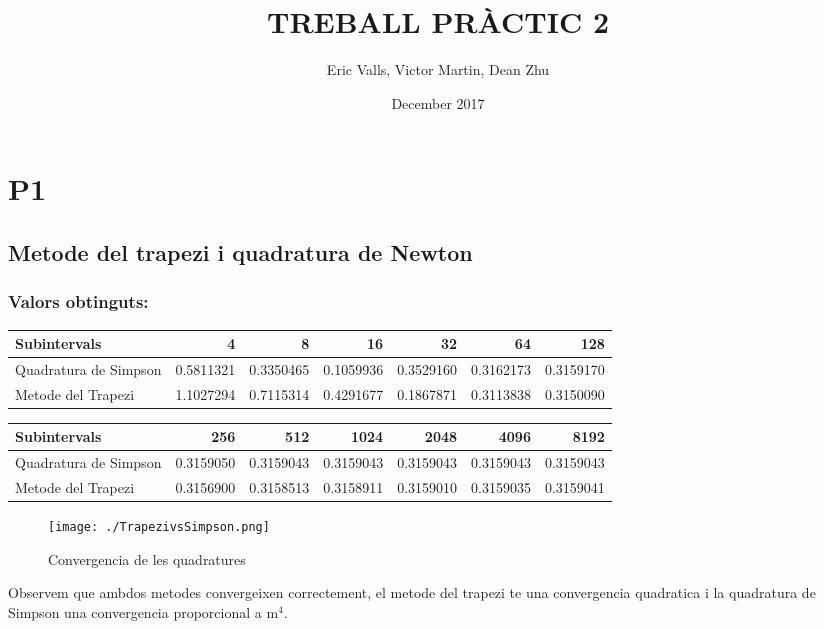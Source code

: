 \documentclass{article}
\title{TREBALL PRÀCTIC 2}
\author{Eric Valls, Victor Martin, Dean Zhu}
\date{December 2017}
\begin{document}
\maketitle
\section{P1}
\label{sec:orgc9ba521}
\subsection{Metode del trapezi i quadratura de Newton}
\label{sec:org8b1c0b6}
\subsubsection{Valors obtinguts:}
\label{sec:org29610ac}
\begin{center}
\begin{tabular}{lrrrrrr}
Subintervals & 4 & 8 & 16 & 32 & 64 & 128\\
\hline
Quadratura de Simpson & 0.5811321 & 0.3350465 & 0.1059936 & 0.3529160 & 0.3162173 & 0.3159170\\
Metode del Trapezi & 1.1027294 & 0.7115314 & 0.4291677 & 0.1867871 & 0.3113838 & 0.3150090\\
\end{tabular}
\end{center}

\begin{center}
\begin{tabular}{lrrrrrr}
Subintervals & 256 & 512 & 1024 & 2048 & 4096 & 8192\\
\hline
Quadratura de Simpson & 0.3159050 & 0.3159043 & 0.3159043 & 0.3159043 & 0.3159043 & 0.3159043\\
Metode del Trapezi & 0.3156900 & 0.3158513 & 0.3158911 & 0.3159010 & 0.3159035 & 0.3159041\\
\end{tabular}
\end{center}

\begin{figure}[htbp]
\centering
\texttt{[image: ./TrapezivsSimpson.png]}
\caption{\label{fig:orged97759}
Convergencia de les quadratures}
\end{figure}

Observem que ambdos metodes convergeixen correctement, el metode del trapezi te una convergencia quadratica i la quadratura de Simpson una convergencia proporcional a m\(^{\text{4}}\).
\end{document}
